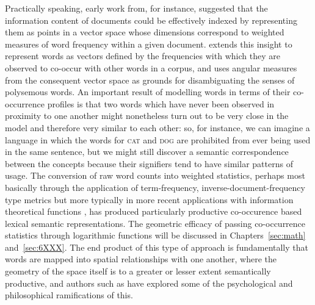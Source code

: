 Practically speaking, early work from, for instance, \cite{SaltonEA1975} suggested that the information content of documents could be effectively indexed by representing them as points in a vector space whose dimensions correspond to weighted measures of word frequency within a given document.  \cite{Schutze1992} extends this insight to represent words as vectors defined by the frequencies with which they are observed to co-occur with other words in a corpus, and uses angular measures from the consequent vector space as grounds for disambiguating the senses of polysemous words.  An important result of modelling words in terms of their co-occurrence profiles is that two words which have never been observed in proximity to one another might nonetheless turn out to be very close in the model and therefore very similar to each other: so, for instance, we can imagine a language in which the words for \textsc{cat} and \textsc{dog} are prohibited from ever being used in the same sentence, but we might still discover a semantic correspondence between the concepts because their signifiers tend to have similar patterns of usage.  The conversion of raw word counts into weighted statistics, perhaps most basically through the application of term-frequency, inverse-document-frequency type metrics \citep{SaltonEA1988} but more typically in more recent applications with information theoretical functions \citep{Turney2001}, has produced particularly productive co-occurence based lexical semantic representations.  The geometric efficacy of passing co-occurrence statistics through logarithmic functions will be discussed in Chapters~\ref{sec:math} and~\ref{sec:6XXX}.  The end product of this type of approach is fundamentally that words are mapped into spatial relationships with one another, where the geometry of the space itself is to a greater or lesser extent semantically productive, and authors such as \cite{LandauerEA1997b} have explored some of the psychological and philosophical ramifications of this.

